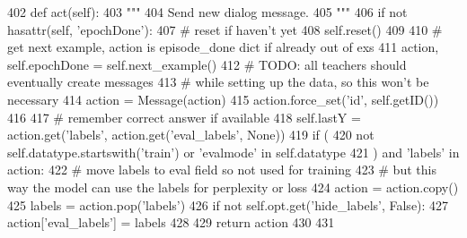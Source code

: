 \begin{DoxyCode}
402     \textcolor{keyword}{def }act(self):
403         \textcolor{stringliteral}{"""}
404 \textcolor{stringliteral}{        Send new dialog message.}
405 \textcolor{stringliteral}{        """}
406         \textcolor{keywordflow}{if} \textcolor{keywordflow}{not} hasattr(self, \textcolor{stringliteral}{'epochDone'}):
407             \textcolor{comment}{# reset if haven't yet}
408             self.reset()
409 
410         \textcolor{comment}{# get next example, action is episode\_done dict if already out of exs}
411         action, self.epochDone = self.next\_example()
412         \textcolor{comment}{# TODO: all teachers should eventually create messages}
413         \textcolor{comment}{# while setting up the data, so this won't be necessary}
414         action = Message(action)
415         action.force\_set(\textcolor{stringliteral}{'id'}, self.getID())
416 
417         \textcolor{comment}{# remember correct answer if available}
418         self.lastY = action.get(\textcolor{stringliteral}{'labels'}, action.get(\textcolor{stringliteral}{'eval\_labels'}, \textcolor{keywordtype}{None}))
419         \textcolor{keywordflow}{if} (
420             \textcolor{keywordflow}{not} self.datatype.startswith(\textcolor{stringliteral}{'train'}) \textcolor{keywordflow}{or} \textcolor{stringliteral}{'evalmode'} \textcolor{keywordflow}{in} self.datatype
421         ) \textcolor{keywordflow}{and} \textcolor{stringliteral}{'labels'} \textcolor{keywordflow}{in} action:
422             \textcolor{comment}{# move labels to eval field so not used for training}
423             \textcolor{comment}{# but this way the model can use the labels for perplexity or loss}
424             action = action.copy()
425             labels = action.pop(\textcolor{stringliteral}{'labels'})
426             \textcolor{keywordflow}{if} \textcolor{keywordflow}{not} self.opt.get(\textcolor{stringliteral}{'hide\_labels'}, \textcolor{keyword}{False}):
427                 action[\textcolor{stringliteral}{'eval\_labels'}] = labels
428 
429         \textcolor{keywordflow}{return} action
430 
431 
\end{DoxyCode}
\mbox{\label{classparlai_1_1core_1_1teachers_1_1FixedDialogTeacher_afa75426a7578e8aad5b74964219345be}} 
